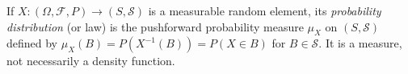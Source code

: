 
If $X:(\Omega,\mathcal F,P)\to(S,\mathcal S)$ is a measurable random element, its \emph{probability distribution} (or law) is the pushforward probability measure $\mu_X$ on $(S,\mathcal S)$ defined by $\mu_X(B)=P(X^{-1}(B))=P(X\in B)$ for $B\in\mathcal S$. It is a measure, not necessarily a density function.
